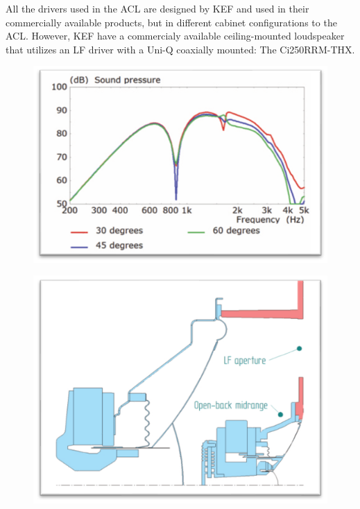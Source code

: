 \documentclass{report}
\begin{document}
        All the drivers used in the ACL are designed by KEF and used in their commercially available products, but in different cabinet configurations to the ACL.
        However, KEF have a commercialy available ceiling-mounted loudspeaker that utilizes an LF driver with a Uni-Q coaxially mounted: The Ci250RRM-THX.
        \begin{figure}[H]
            \begin{minipage}{.49\textwidth}
                \includegraphics[width=\linewidth]{figs/KEFpressure.png}%
                \centering
                \caption{}
                \label{KEFpressure} \cite{KEFCi}
            \end{minipage}
            \begin{minipage}{.49\textwidth}
                \includegraphics[width=\linewidth]{figs/KEFdiagram.png}%
                \centering
                \caption{ } \cite{KEFCi}
                \label{KEFdiagram}
        \end{minipage}
        \end{figure}
\end{document}
